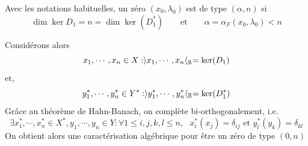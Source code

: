 \documentclass[memoire.tex]{subfiles}
\begin{document}
\begin{definition}
    Avec les notations habituelles, un zéro $(x_0,\lambda_0)$ est de type $(\alpha,n)$ si
    \begin{equation*}
        \dim \ker D_1=n=\dim \ker(D_1^{*})\qquad  \text{et}\qquad   \alpha=\alpha_F(x_0,\lambda_0)<n
    \end{equation*}
\end{definition}

Considérons alors 
\begin{equation*}
    x_1,\cdots,x_n\in X : \rangle x_1,\cdots,x_n\langle_{\mathbb{R}}=\ker(D_1)
\end{equation*}
et, 
\begin{equation*}
     y^{*}_1,\cdots,y^{*}_n\in Y^{*}: \rangle y^{*}_1,\cdots, y^{*}_{n}  \langle_{\mathbb{R}}=\ker(D_1^{*})
\end{equation*}
Grâce au théorème de Hahn-Banach, on complète bi-orthogonalement, i.e. 
\begin{equation}\label{BasebiOrtho}
    \exists x^{*}_1,\cdots,x^{*}_n\in X^{*}, y_1,\cdots,y_n\in Y : \forall 1\leq i,j,k,l\leq n,\text{  } x_i^{*}(x_j)=\delta_{ij}\text{ et } y_l^{*}(y_k)=\delta_{kl}
\end{equation}
On obtient alors une caractérisation algébrique pour être un zéro de type $(0,n)$
\end{document}
